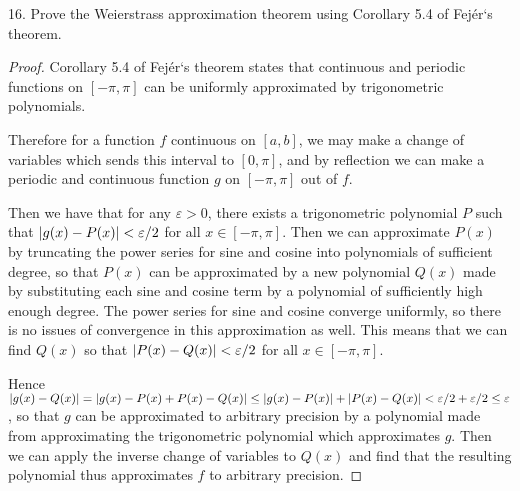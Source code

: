 \documentclass[11pt]{article}
\begin{document}
16. Prove the Weierstrass approximation theorem using Corollary 5.4 of Fej\'er`s theorem. \begin{proof}
    Corollary 5.4 of Fej\'er`s theorem states that continuous and periodic functions on $[-\pi,\pi]$ can be uniformly approximated by trigonometric polynomials.

    Therefore for a function $f$ continuous on $[a,b]$, we may make a change of variables which sends this interval to $[0,\pi]$, and by reflection we can make a periodic and continuous function $g$ on $[-\pi,\pi]$ out of $f$.

    Then we have that for any $\varepsilon>0$, there exists a trigonometric polynomial $P$ such that $\abs{g(x)-P(x)} < \varepsilon/2$ for all $x\in[-\pi,\pi]$. Then we can approximate $P(x)$ by truncating the power series for sine and cosine into polynomials of sufficient degree, so that $P(x)$ can be approximated by a new polynomial $Q(x)$ made by substituting each sine and cosine term by a polynomial of sufficiently high enough degree. The power series for sine and cosine converge uniformly, so there is no issues of convergence in this approximation as well. This means that we can find $Q(x)$ so that $\abs{P(x)-Q(x)} < \varepsilon/2$ for all $x\in[-\pi,\pi]$.

    Hence $\abs{g(x)-Q(x)} = \abs{g(x)-P(x)+P(x)-Q(x)}\leq \abs{g(x)-P(x)} + \abs{P(x)-Q(x)} < \varepsilon/2 +\varepsilon/2 \leq \varepsilon$, so that $g$ can be approximated to arbitrary precision by a polynomial made from approximating the trigonometric polynomial which approximates $g$. Then we can apply the inverse change of variables to $Q(x)$ and find that the resulting polynomial thus approximates $f$ to arbitrary precision.
\end{proof}
\end{document}

